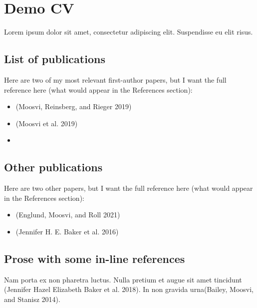 \documentclass[
]{article}
\author{}
\date{}
\providecommand{\tightlist}{%
  \setlength{\itemsep}{0pt}\setlength{\parskip}{0pt}}
\begin{document}
\hypertarget{demo-cv}{%
\section{Demo CV}\label{demo-cv}}

Lorem ipsum dolor sit amet, consectetur adipiscing elit. Suspendisse eu
elit risus.

\hypertarget{list-of-publications}{%
\subsection{List of publications}\label{list-of-publications}}

Here are two of my most relevant first-author papers, but I want the
full reference here (what would appear in the References section):

\begin{itemize}
\tightlist
\item
  (Moosvi, Reinsberg, and Rieger 2019)
\item
  (Moosvi et al. 2019)
\end{itemize}

\begin{itemize}
  \item {}

\end{itemize}

\hypertarget{other-publications}{%
\subsection{Other publications}\label{other-publications}}

Here are two other papers, but I want the full reference here (what
would appear in the References section):

\begin{itemize}
\tightlist
\item
  (Englund, Moosvi, and Roll 2021)
\item
  (Jennifer H. E. Baker et al. 2016)
\end{itemize}

\hypertarget{prose-with-some-in-line-references}{%
\subsection{Prose with some in-line
references}\label{prose-with-some-in-line-references}}

Nam porta ex non pharetra luctus. Nulla pretium et augue sit amet
tincidunt (Jennifer Hazel Elizabeth Baker et al. 2018). In non gravida
urna(Bailey, Moosvi, and Stanisz 2014).
\end{document}
